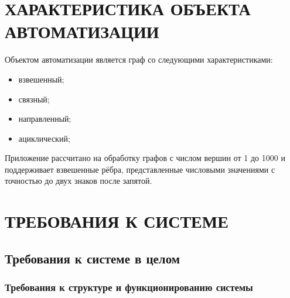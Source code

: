 \documentclass[12pt,a4paper]{article}
\begin{document}
\newpage
\section{ХАРАКТЕРИСТИКА ОБЪЕКТА АВТОМАТИЗАЦИИ}
Объектом автоматизации является граф со следующими характеристиками:
\begin{itemize}
    \item взвешенный;
    \item связный;
    \item направленный;
    \item ациклический;
\end{itemize}

\medskip Приложение рассчитано на обработку графов с числом вершин от 1 до 1000 и поддерживает взвешенные рёбра, 
представленные числовыми значениями с точностью до двух знаков после запятой.

\newpage
\section{ТРЕБОВАНИЯ К СИСТЕМЕ}
\subsection{Требования к системе в целом}
\subsubsection{Требования к структуре и функционированию системы}
\end{document}
